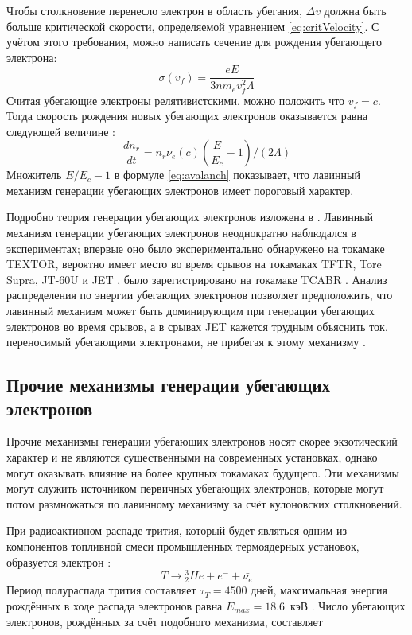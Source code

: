 Чтобы столкновение перенесло электрон в область убегания, $\Delta v$ должна быть больше критической скорости, определяемой уравнением \ref{eq:critVelocity}. С учётом этого требования, можно написать сечение для рождения убегающего электрона:
\begin{equation*}
  \sigma(v_f) = \frac{ e E }{ 3 n m_e v_f^2 \Lambda }
\end{equation*}
Считая убегающие электроны релятивистскими, можно положить что $v_f = c$. Тогда скорость рождения новых убегающих электронов оказывается равна следующей величине \cite{Rozansky2012}:
\begin{equation}
  \label{eq:avalanch}
  \frac{ d n_r }{ d t } = n_r \nu_e(c) \left( \frac{E}{E_c} - 1 \right) / \left( 2 \Lambda \right)
\end{equation}
Множитель $E/E_c - 1 $ в формуле \ref{eq:avalanch} показывает, что лавинный механизм генерации убегающих электронов имеет пороговый характер.

Подробно теория генерации убегающих электронов изложена в \cite{Rosenbluth1997}. Лавинный механизм генерации убегающих электронов неоднократно наблюдался в экспериментах; впервые оно было экспериментально обнаружено на токамаке TEXTOR, вероятно имеет место во время срывов на токамаках TFTR, Tore Supra, JT-60U и JET \cite{Gill2002,Helander2002}, было зарегистрировано на токамаке TCABR \cite{Galvao2001}. Анализ распределения по энергии убегающих электронов позволяет предположить, что лавинный механизм может быть доминирующим при генерации убегающих электронов во время срывов, а в срывах JET кажется трудным объяснить ток, переносимый убегающими электронами, не прибегая к этому механизму \cite{Helander2002}.



\subsection{Прочие механизмы генерации убегающих электронов}

Прочие механизмы генерации убегающих электронов носят скорее экзотический характер и не являются существенными на современных установках, однако могут оказывать влияние на более крупных токамаках будущего. Эти механизмы могут служить источником первичных убегающих электронов, которые могут потом размножаться по лавинному механизму за счёт кулоновских столкновений.

При радиоактивном распаде трития, который будет являться одним из компонентов топливной смеси промышленных термоядерных установок, образуется электрон \cite{Burrows1990}:
\begin{equation*}
  T \rightarrow {}^3_2 He + e^{-} + \bar{ \nu_e }
\end{equation*}
Период полураспада трития составляет $ \tau_T = 4500 $ дней, максимальная энергия рождённых в ходе распада электронов равна $ E_{max} = 18.6$~кэВ \cite{MartinSolis2017}. Число убегающих электронов, рождённых за счёт подобного механизма, составляет

